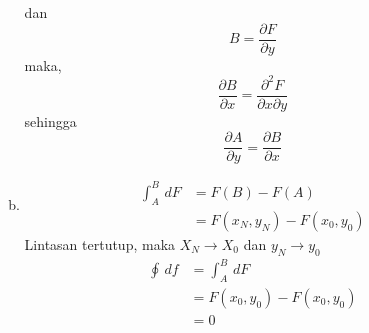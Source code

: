 \begin{enumerate}
\begin{enumerate}[(a)]
\begin{equation*}
        \end{equation*}
        dan 
        \begin{equation*}
            B=\dfrac{\partial F}{\partial y}
        \end{equation*}
        maka,
        \begin{equation*}
            \dfrac{\partial B}{\partial x}=\dfrac{\partial^2 F}{\partial x\partial y}
        \end{equation*}
        sehingga 
        \begin{equation*}
            \dfrac{\partial A}{\partial y}=\dfrac{\partial B}{\partial x}
        \end{equation*}
        \item 
        \begin{equation*}
            \begin{split}
                \int_A^B \,dF&=F(B)-F(A)\\
                &=F(x_N,y_N)- F(x_0,y_0)
            \end{split}
        \end{equation*}
        Lintasan tertutup, maka $X_N\rightarrow X_0$ dan $y_N\rightarrow y_0$
        \begin{equation*}
            \begin{split}
                \oint\,df&=\int_A^B\,dF\\
                &=F(x_0,y_0)- F(x_0,y_0)\\
                &=0
            \end{split}
        \end{equation*}
    \end{enumerate}
\end{enumerate}